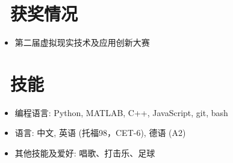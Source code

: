 \documentclass{resume}
\begin{document}
\section{\faHeartO\ 获奖情况}

\begin{itemize}
	\item 第二届虚拟现实技术及应用创新大赛
\end{itemize}

\section{\faCogs\ 技能}
\begin{itemize}[parsep=0.5ex]
  \item 编程语言:  Python, MATLAB, C++, JavaScript, git, bash
  \item 语言: 中文, 英语 (托福98，CET-6), 德语 (A2)
  \item 其他技能及爱好: 唱歌、打击乐、足球
\end{itemize}
\end{document}

